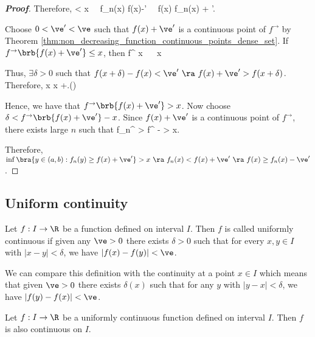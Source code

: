 \begin{proof}[\bf Proof]
Therefore,
\be
\inf{} < x \ \ra\  f_n(x) \geq f(x)-\ve' \ \ra\ f(x) \leq f_n(x) + \ve'.
\ee




Choose $0<\ve'<\ve$ such that $f(x)+\ve'$ is a continuous point of $f^{\to}$ by Theorem \ref{thm:non_decreasing_function_continuous_points_dense_set}. If $f^{\to}\brb{f(x)+\ve'} \leq x$, then
\be
f^{\to} \leq x \ \ra\ \inf{} \leq x
\ee

Thus, $\exists \delta >0$ such that $f(x+\delta)-f(x)< \ve' \ \ra \ f(x)+\ve' > f(x+\delta)$. Therefore,
\be
x\geq \inf{} \geq x +\delta.\qquad ()
\ee

Hence, we have that $f^{\to}\brb{f(x)+\ve'} > x$. Now choose $\delta < f^{\to}\brb{f(x)+\ve'}-x$. Since $f(x)+\ve'$ is a continuous point of $f^{\to}$, there exists large $n$ such that
\be
f_n^{\to} > f^{\to} - \delta > x.
\ee

Therefore, $\inf\bra{y\in (a,b): f_n(y) \geq f(x)+\ve'} > x \ \ra\  f_n(x) < f(x)+\ve' \ \ra\ f(x) \geq f_n(x) - \ve'$.
\end{proof}


\subsection{Uniform continuity}

\begin{definition}\label{def:uniformly_continuous_function_real}
Let $f:I\to \R$ be a function defined on interval $I$. Then $f$ is called uniformly continuous if given any $\ve>0$ there exists $\delta>0$ such that for every $x,y\in I$ with $|x-y|<\delta$, we have $|f(x)-f(y)|<\ve$.
\end{definition}

\begin{remark}
We can compare this definition with the continuity at a point $x\in I$ which means that given $\ve>0$ there exists $\delta(x)$ such that for any $y$ with $|y-x|<\delta$, we have $|f(y)-f(x)|<\ve$.
\end{remark}

\begin{proposition}
Let $f:I\to \R$ be a uniformly continuous function defined on interval $I$. Then $f$ is also continuous on $I$.
\end{proposition}

